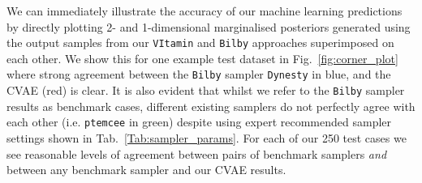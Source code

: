 %
%
We can immediately illustrate the accuracy of our machine learning predictions
by directly plotting 2- and 1-dimensional marginalised posteriors generated
using the output samples from our \texttt{VItamin} and \texttt{Bilby}
approaches superimposed on each other. We show this for one example test
dataset in Fig.~\ref{fig:corner_plot} where strong agreement between the
\texttt{Bilby} sampler \texttt{Dynesty} in blue,  and the
\ac{CVAE} (red) is clear. It is also evident that whilst we refer to the
\texttt{Bilby} sampler results as benchmark cases, different existing samplers
do not perfectly agree with each other (i.e. \texttt{ptemcee} in green) despite using 
expert recommended sampler settings shown in Tab.~\ref{Tab:sampler_params}.  
For each of our 250 test cases we see
reasonable levels of agreement between pairs of benchmark samplers \emph{and}
between any benchmark sampler and our \ac{CVAE} results. 

